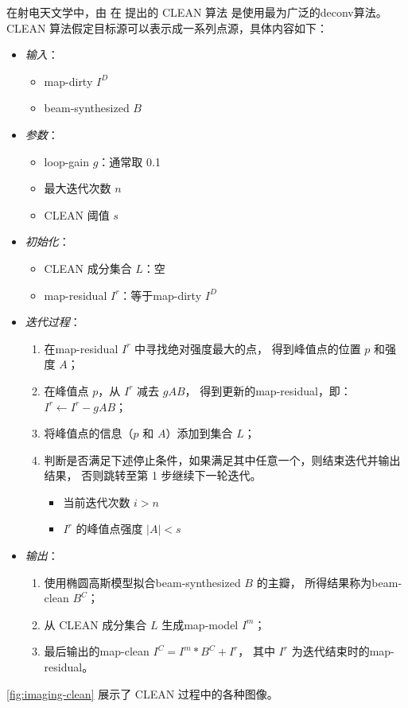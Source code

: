 在射电天文学中，由 \citeauthor{hogbom1974} 在 \citeyear{hogbom1974}
提出的 CLEAN 算法 \cite{hogbom1974} 是使用最为广泛的\ac{deconv}算法。
CLEAN 算法假定目标源可以表示成一系列点源，具体内容如下：
\begin{itemize}
  \item \emph{输入}：
    \begin{itemize}
      \item \ac{map-dirty} $I^D$
      \item \ac{beam-synthesized} $B$
    \end{itemize}
  \item \emph{参数}：
    \begin{itemize}
      \item \ac{loop-gain} $g$：通常取 0.1
      \item 最大迭代次数 $n$
      \item CLEAN 阈值 $s$
    \end{itemize}
  \item \emph{初始化}：
    \begin{itemize}
      \item CLEAN 成分集合 $L$：空
      \item \ac{map-residual} $I^r$：等于\ac{map-dirty} $I^D$
    \end{itemize}
  \item \emph{迭代过程}：
    \begin{enumerate}
      \item 在\ac{map-residual} $I^r$ 中寻找绝对强度最大的点，
        得到峰值点的位置 $p$ 和强度 $A$；
      \item 在峰值点 $p$，从 $I^r$ 减去 $g A B$，
        得到更新的\ac{map-residual}，即：
        $I^r \gets I^r - g A B$；
      \item 将峰值点的信息（$p$ 和 $A$）添加到集合 $L$；
      \item 判断是否满足下述停止条件，如果满足其中任意一个，则结束迭代并输出结果，
        否则跳转至第 1 步继续下一轮迭代。
        \begin{itemize}
          \item 当前迭代次数 $i > n$
          \item $I^r$ 的峰值点强度 $|A| < s$
        \end{itemize}
    \end{enumerate}
  \item \emph{输出}：
    \begin{enumerate}
      \item 使用椭圆高斯模型拟合\ac{beam-synthesized} $B$ 的主瓣，
        所得结果称为\ac{beam-clean} $B^C$；
      \item 从 CLEAN 成分集合 $L$ 生成\ac{map-model} $I^m$；
      \item 最后输出的\ac{map-clean} $I^C = I^m * B^C + I^r$，
        其中 $I^r$ 为迭代结束时的\ac{map-residual}。
    \end{enumerate}
\end{itemize}
\autoref{fig:imaging-clean} 展示了 CLEAN 过程中的各种图像。

